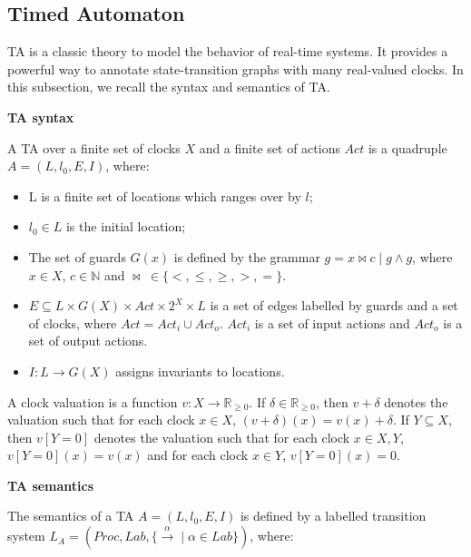 \subsection{Timed Automaton}
TA \cite{BehrmannDLHPYH06} is a classic theory to model the behavior of real-time systems. It provides a powerful way to annotate state-transition graphs with many real-valued clocks. In this subsection, we recall the syntax and semantics of TA. 
\begin{definition}
\textbf{TA syntax}

A TA over a finite set of clocks $X$ and a finite set of actions $Act$ is a quadruple $\textit{A}=(L,l_{0},E,I)$, where:
\end{definition}
\begin{itemize}
\item
L is a finite set of locations which ranges over by $l$;
\item
$l_{0} \in  L$ is the initial location;
\item
The set of guards $G(x)$ is defined by the grammar $g = x \bowtie c \mid g \land g$, where $x \in X$, $c \in \mathbb{N}$ and $\bowtie~\in \{<,\leqslant,\geqslant,>,=\}$. 
\item
$E \subseteq L \times G(X) \times Act \times 2^X \times L$ is a set of edges labelled by guards and a set of clocks, where $Act = Act_{i} \cup Act_{o}$. $Act_{i}$ is a set of input actions and $Act_{o}$ is a set of output actions.
\item
$I : L \rightarrow G(X)$ assigns invariants to locations.
\end{itemize}
A clock valuation is a function $v : X \rightarrow \mathbb{R}_{\geqslant{0}}$. If $\delta \in \mathbb{R}_{\geqslant{0}}$, then $v + \delta$ denotes the valuation such that for each clock $x \in X$, $(v + \delta)(x) = v(x) + \delta$. If $Y \subseteq X$, then $v[Y = 0]$ denotes the valuation such that for each clock $x \in X, Y$, $v[Y = 0](x) = v(x)$ and for each clock $x \in Y$, $v[Y = 0](x) = 0$.
\begin{definition}
\textbf{TA semantics} 

The semantics of a TA $\textit{A}=(L,l_{0},E,I)$ is defined by a labelled transition system $L_{\textit{A}} = (Proc,Lab,\lbrace {{\xrightarrow{\alpha}}} \mid \alpha \in Lab \rbrace)$, where:
\end{definition}
